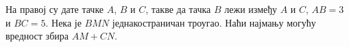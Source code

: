 \problem
На правој су дате тачке $A$, $B$ и $C$, такве да тачка $B$ лежи између $A$ и
$C$, $AB = 3$ и $BC = 5$.
Нека је $BMN$ једнакостраничан троугао.
Наћи најмању могућу вредност збира $AM+CN$.

\solution

\endproblem
